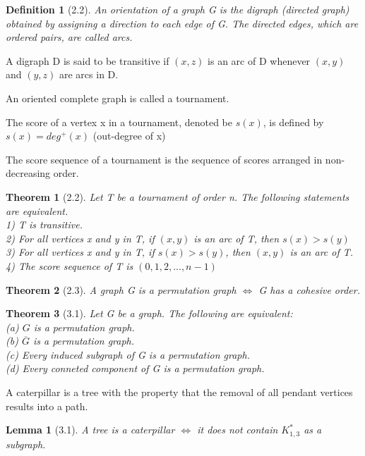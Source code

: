 \documentclass{article}
\newtheorem*{definition}{Definition}
\newtheorem*{theorem}{Theorem}
\newtheorem*{lemma}{Lemma}
\begin{document}
\begin{definition}[2.2]
    An orientation of a graph G is the digraph (directed graph) obtained by assigning a direction to each edge of G. The directed edges, which are ordered pairs, are called arcs.
\end{definition}

A digraph D is said to be transitive if $(x, z)$ is an arc of D whenever $(x, y)$ and $(y, z)$ are arcs in D.

An oriented complete graph is called a tournament.

The score of a vertex x in a tournament, denoted be $s(x)$, is defined by $s(x) = deg^{+}(x)$ (out-degree of x)

The score sequence of a tournament is the sequence of scores arranged in non-decreasing order.

\begin{theorem}[2.2]
    Let T be a tournament of order n. The following statements are equivalent.\\
    1) T is transitive. \\
    2) For all vertices x and y in T, if $(x, y)$ is an arc of T, then $s(x) > s(y)$ \\
    3) For all vertices x and y in T, if $s(x) > s(y)$, then $(x, y)$ is an arc of T. \\
    4) The score sequence of T is $(0, 1, 2,..., n-1)$

\end{theorem}

\begin{theorem}[2.3]
    A graph G is a permutation graph $\Leftrightarrow$ G has a cohesive order.
\end{theorem}

\begin{theorem}[3.1]
    Let G be a graph. The following are equivalent:\\
    (a) $G$ is a permutation graph. \\
    (b) $\overline G$ is a permutation graph. \\
    (c) Every induced subgraph of G is a permutation graph. \\
    (d) Every conneted component of G is a permutation graph. \\
\end{theorem}

A caterpillar is a tree with the property that the removal of all pendant vertices results into a path.

\begin{lemma}[3.1]
    A tree is a caterpillar $\Leftrightarrow$ it does not contain $K^*_{1, 3}$ as a subgraph.
\end{lemma}
\end{document}
